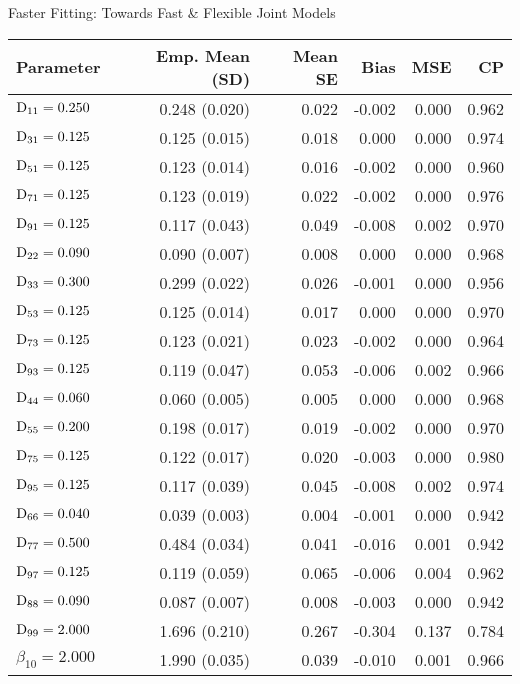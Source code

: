 \begin{chapter}{\label{cha:flexible}Faster Fitting: Towards Fast \& Flexible Joint Models}
\begin{table}[ht]
\centering
{}
\captionsetup{font=scriptsize}
\scriptsize
\begin{tabular}{l|rrrrr}
Parameter & Emp. Mean (SD) & Mean SE & Bias & MSE & CP \\ 
  \hline
  $\mathrm{D}_{11}= 0.250$ &  0.248 (0.020) & 0.022 & -0.002 & 0.000 & 0.962 \\ 
  $\mathrm{D}_{31}= 0.125$ &  0.125 (0.015) & 0.018 &  0.000 & 0.000 & 0.974 \\ 
  $\mathrm{D}_{51}= 0.125$ &  0.123 (0.014) & 0.016 & -0.002 & 0.000 & 0.960 \\ 
  $\mathrm{D}_{71}= 0.125$ &  0.123 (0.019) & 0.022 & -0.002 & 0.000 & 0.976 \\ 
  $\mathrm{D}_{91}= 0.125$ &  0.117 (0.043) & 0.049 & -0.008 & 0.002 & 0.970 \\ 
  $\mathrm{D}_{22}= 0.090$ &  0.090 (0.007) & 0.008 &  0.000 & 0.000 & 0.968 \\ 
  $\mathrm{D}_{33}= 0.300$ &  0.299 (0.022) & 0.026 & -0.001 & 0.000 & 0.956 \\ 
  $\mathrm{D}_{53}= 0.125$ &  0.125 (0.014) & 0.017 &  0.000 & 0.000 & 0.970 \\ 
  $\mathrm{D}_{73}= 0.125$ &  0.123 (0.021) & 0.023 & -0.002 & 0.000 & 0.964 \\ 
  $\mathrm{D}_{93}= 0.125$ &  0.119 (0.047) & 0.053 & -0.006 & 0.002 & 0.966 \\ 
  $\mathrm{D}_{44}= 0.060$ &  0.060 (0.005) & 0.005 &  0.000 & 0.000 & 0.968 \\ 
  $\mathrm{D}_{55}= 0.200$ &  0.198 (0.017) & 0.019 & -0.002 & 0.000 & 0.970 \\ 
  $\mathrm{D}_{75}= 0.125$ &  0.122 (0.017) & 0.020 & -0.003 & 0.000 & 0.980 \\ 
  $\mathrm{D}_{95}= 0.125$ &  0.117 (0.039) & 0.045 & -0.008 & 0.002 & 0.974 \\ 
  $\mathrm{D}_{66}= 0.040$ &  0.039 (0.003) & 0.004 & -0.001 & 0.000 & 0.942 \\ 
  $\mathrm{D}_{77}= 0.500$ &  0.484 (0.034) & 0.041 & -0.016 & 0.001 & 0.942 \\ 
  $\mathrm{D}_{97}= 0.125$ &  0.119 (0.059) & 0.065 & -0.006 & 0.004 & 0.962 \\ 
  $\mathrm{D}_{88}= 0.090$ &  0.087 (0.007) & 0.008 & -0.003 & 0.000 & 0.942 \\ 
  $\mathrm{D}_{99}= 2.000$ &  1.696 (0.210) & 0.267 & -0.304 & 0.137 & 0.784 \\ 
  $\beta_{10}= 2.000$ &  1.990 (0.035) & 0.039 & -0.010 & 0.001 & 0.966 \\ 

\end{tabular}
\end{table}
\end{chapter}
